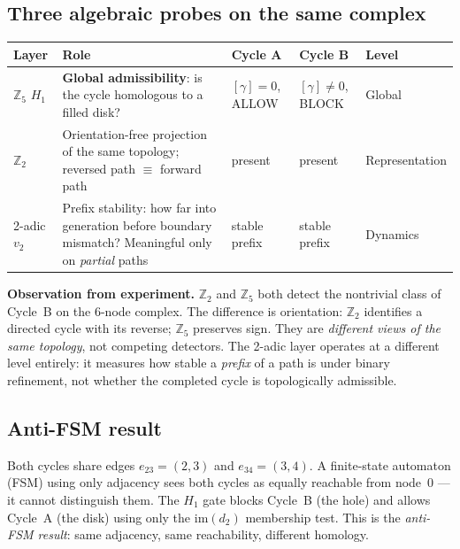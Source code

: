 \documentclass[11pt,a4paper]{article}
\begin{document}
\subsection{Three algebraic probes on the same complex}

\begin{center}
\renewcommand{\arraystretch}{1.3}\small
\begin{tabular}{p{2.0cm}p{3.8cm}p{2.2cm}p{2.2cm}p{2.2cm}}
\toprule
\textbf{Layer} & \textbf{Role} & \textbf{Cycle A} & \textbf{Cycle B}
  & \textbf{Level} \\
\midrule
$\mathbb{Z}_5$ $H_1$ &
  \textbf{Global admissibility}: is the cycle homologous to a filled disk? &
  $[\gamma]=0$, ALLOW &
  $[\gamma]\neq 0$, BLOCK &
  Global \\
$\mathbb{Z}_2$ &
  Orientation-free projection of the same topology; reversed path $\equiv$ forward path &
  present &
  present &
  Representation \\
2-adic $v_2$ &
  Prefix stability: how far into generation before boundary mismatch?
  Meaningful only on \emph{partial} paths &
  stable prefix &
  stable prefix &
  Dynamics \\
\bottomrule
\end{tabular}
\end{center}

\noindent
\textbf{Observation from experiment.}
$\mathbb{Z}_2$ and $\mathbb{Z}_5$ both detect the nontrivial class of
Cycle~B on the 6-node complex.
The difference is orientation: $\mathbb{Z}_2$ identifies a directed
cycle with its reverse; $\mathbb{Z}_5$ preserves sign.
They are \emph{different views of the same topology}, not competing detectors.
The 2-adic layer operates at a different level entirely: it measures
how stable a \emph{prefix} of a path is under binary refinement,
not whether the completed cycle is topologically admissible.

\subsection{Anti-FSM result}

Both cycles share edges $e_{23}=(2,3)$ and $e_{34}=(3,4)$.
A finite-state automaton (FSM) using only adjacency sees both cycles
as equally reachable from node~0 --- it cannot distinguish them.
The $H_1$ gate blocks Cycle~B (the hole) and allows Cycle~A (the disk)
using only the $\mathrm{im}(d_2)$ membership test.
This is the \emph{anti-FSM result}: same adjacency, same reachability,
different homology.
\end{document}
